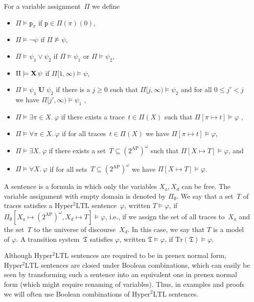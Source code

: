 \documentclass[dvipsnames,10pt,a4paper]{amsart}
\theoremstyle{definition}
\theoremstyle{remark}
\renewcommand{\phi}{\varphi}
\newcommand{\pow}[1]{2^{#1}}
\DeclareMathOperator{\U}{\mathbf{U}}
\newcommand{\X}{\mathop{\mathbf{X}\vphantom{a}}\nolimits}
\newcommand{\sohyltl}{\mathrm{Hyper^2LTL}\xspace}
\newcommand{\suffix}[2]{#1[#2,\infty)}
\newcommand{\ap}[0]{\mathrm{AP}}
\newcommand{\univar}{X_a}
\newcommand{\unidisvar}{X_d}
\newcommand{\tsys}{\mathfrak{T}}
\newcommand{\traces}{\mathrm{Tr}}
\newcommand{\proposition}{\texttt{p}}
\begin{document}
For a variable assignment~$\Pi$ we define 
\begin{itemize}
	\item $\Pi \models \proposition_\pi$ if $\proposition \in \Pi(\pi)(0)$,
	\item $\Pi \models \neg \psi$ if $\Pi \not\models \psi$,
	\item $\Pi \models \psi_1 \vee \psi_2 $ if $\Pi \models \psi_1$ or $\Pi  \models \psi_2$,
	\item $\Pi \models \X \psi$ if $\suffix{\Pi}{1} \models \psi$,
	\item $\Pi \models \psi_1 \U \psi_2$ if there is a $j \ge 0$ such that $\suffix{\Pi}{j} \models \psi_2$ and for all $0 \le j' < j$ we have $ \suffix{\Pi}{j'} \models \psi_1$ ,
	\item $\Pi \models \exists \pi \in X.\ \phi$ if there exists a trace~$t \in \Pi(X)$ such that $\Pi[\pi \mapsto t] \models \phi$ ,
	\item $\Pi \models \forall \pi \in X.\ \phi$ if for all traces~$t \in \Pi(X)$ we have $\Pi[\pi \mapsto t] \models \phi$,
    \item $\Pi \models \exists X.\ \phi$ if there exists a set~$T \subseteq (\pow{\ap})^\omega$ such that $\Pi[X\mapsto T] \models \phi$, and
    \item $\Pi \models \forall X.\ \phi$ if for all sets~$T \subseteq (\pow{\ap})^\omega$ we have $\Pi[X\mapsto T] \models \phi$.
\end{itemize}

A sentence is a formula in which only the variables $\univar,\unidisvar$ can be free. 
The variable assignment with empty domain is denoted by $\Pi_\emptyset$. 
We say that a set~$T$ of traces satisfies a $\sohyltl$ sentence~$\phi$, written $T \models \phi$, if $\Pi_\emptyset[\univar \mapsto (\pow{\ap})^\omega, \unidisvar \mapsto T]\models \phi$, i.e., if we assign the set of all traces to~$\univar$ and the set~$T$ to the universe of discourse~$\unidisvar$.
In this case, we say that $T$ is a model of $\varphi$.
A transition system~$\tsys$ satisfies $\phi$, written $\tsys \models \phi$, if $\traces(\tsys)\models \phi$. 


Although $\sohyltl$ sentences are required to be in prenex normal form, $\sohyltl$ sentences are closed under Boolean combinations, which can easily be seen by transforming such a sentence into an equivalent one in prenex normal form (which might require renaming of variables).
Thus, in examples and proofs we will often use Boolean combinations of $\sohyltl$ sentences. 
\end{document}
